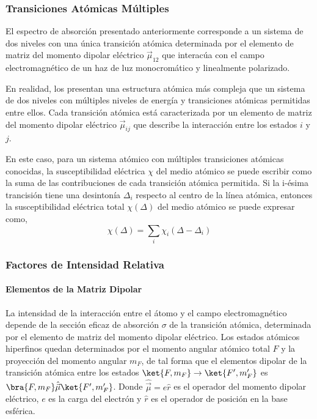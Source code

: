 \subsubsection{Transiciones Atómicas Múltiples}
El espectro de absorción presentado anteriormente corresponde a un sistema de dos niveles con una única transición atómica determinada por el elemento de matriz del momento dipolar eléctrico $\vec{\mu}_{12}$ que interacúa con el campo electromagnético de un haz de luz monocromático y linealmente polarizado. 

En realidad, los presentan una estructura atómica más compleja que un sistema de dos niveles con múltiples niveles de energía y transiciones atómicas permitidas entre ellos. Cada transición atómica está caracterizada por un elemento de matriz del momento dipolar eléctrico $\vec{\mu}_{ij}$ que describe la interacción entre los estados $i$ y $j$.

En este caso, para un sistema atómico con múltiples transiciones atómicas conocidas, la susceptibilidad eléctrica $\chi$ del medio atómico se puede escribir como la suma de las contribuciones de cada transición atómica permitida. Si la i-ésima trancisión tiene una desintonía $\Delta_i$ respecto al centro de la línea atómica, entonces la susceptibilidad eléctrica total $\chi(\Delta)$ del medio atómico se puede expresar como,
\begin{equation}
    \chi(\Delta) = \sum_i \chi_i(\Delta- \Delta_i)
\end{equation}

\subsubsection{Factores de Intensidad Relativa}
\paragraph{Elementos de la Matriz Dipolar}
La intensidad de la interacción entre el átomo y el campo electromagnético depende de la sección eficaz de absorción $\sigma$ de la transición atómica, determinada por el elemento de matriz del momento dipolar eléctrico. Los estados atómicos hiperfinos quedan determinados por el momento angular atómico total $F$ y la proyección del momento angular $m_F$, de tal forma que el elementos dipolar de la transición atómica entre los estados $\ket{F, m_F} \to \ket{F', m_F'}$ es $\bra{F,m_F} \hat{\vec{\mu}} \ket{F', m_F'}$. Donde $\hat{\vec{\mu}} = e \hat{r}$ es el operador del momento dipolar eléctrico, $e$ es la carga del electrón y $\hat{r}$ es el operador de posición en la base esférica.

